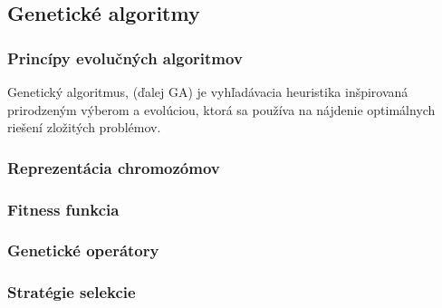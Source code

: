 \subsection{Genetické algoritmy}
\label{subsec:geneticke-algoritmy}

\subsubsection{Princípy evolučných algoritmov}

\hspace{0.5cm}
Genetický algoritmus, (ďalej GA) je vyhľadávacia heuristika inšpirovaná prirodzeným výberom a evolúciou,
ktorá sa používa na nájdenie optimálnych riešení zložitých problémov.

\subsubsection{Reprezentácia chromozómov}

\subsubsection{Fitness funkcia}

\subsubsection{Genetické operátory}

\subsubsection{Stratégie selekcie}



